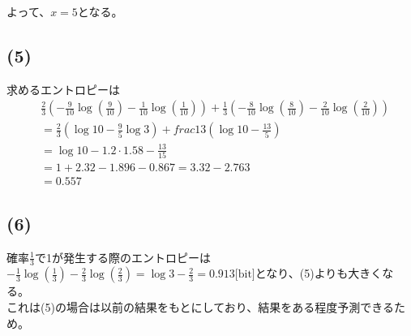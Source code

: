 \documentclass[a4paper,12pt,xelatex,ja=standard]{bxjsarticle}
\begin{document}
よって、$x=5$となる。

\subsection*{(5)}
求めるエントロピーは
\begin{equation*}
  \begin{split}
    &\frac{2}{3}\left(-\frac{9}{10} \log (\frac{9}{10}) - \frac{1}{10} \log (\frac{1}{10})\right) + \frac{1}{3}\left(-\frac{8}{10} \log (\frac{8}{10}) - \frac{2}{10} \log (\frac{2}{10})\right) \\
      &= \frac{2}{3}(\log 10 - \frac{9}{5} \log 3) + frac{1}{3}(\log 10 - \frac{13}{5})\\
      &= \log 10 - 1.2 \cdot 1.58 - \frac{13}{15} \\
      &= 1 + 2.32 - 1.896 - 0.867 = 3.32 - 2.763 \\
      &= 0.557
  \end{split}
\end{equation*}

\subsection*{(6)}
確率$\frac{1}{3}$で1が発生する際のエントロピーは$- \frac{1}{3} \log (\frac{1}{3}) - \frac{2}{3} \log (\frac{2}{3}) = \log 3 - \frac{2}{3} = 0.913 \text{[bit]}$となり、(5)よりも大きくなる。\\
これは(5)の場合は以前の結果をもとにしており、結果をある程度予測できるため。
\end{document}
